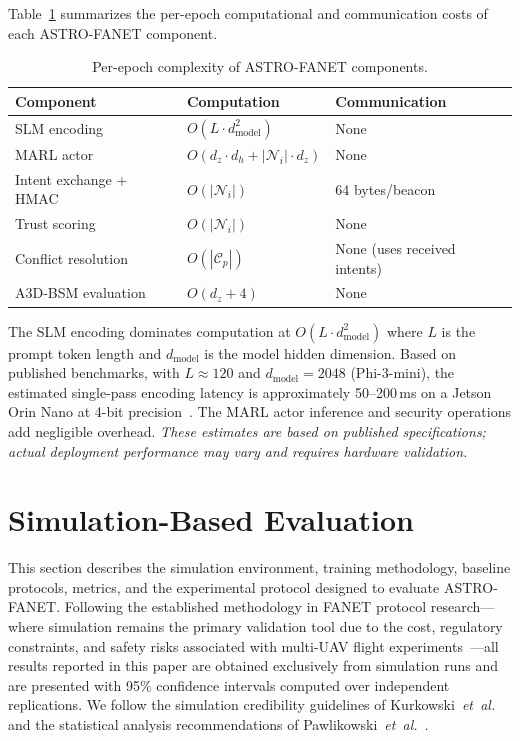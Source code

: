 \documentclass[5p,times]{elsarticle}
\begin{document}
Table~\ref{tab:complexity} summarizes the per-epoch computational and communication costs of each ASTRO-FANET component.

\begin{table}[t]
\centering
\caption{Per-epoch complexity of ASTRO-FANET components.}
\label{tab:complexity}
\scriptsize
\begin{tabular}{lll}
\toprule
Component & Computation & Communication \\
\midrule
SLM encoding & $O(L \cdot d_{\mathrm{model}}^2)$ & None \\
MARL actor & $O(d_z \cdot d_h + |\mathcal{N}_i| \cdot d_z)$ & None \\
Intent exchange + HMAC & $O(|\mathcal{N}_i|)$ & 64 bytes/beacon \\
Trust scoring & $O(|\mathcal{N}_i|)$ & None \\
Conflict resolution & $O(|\mathcal{C}_p|)$ & None (uses received intents) \\
A3D-BSM evaluation & $O(d_z + 4)$ & None \\
\bottomrule
\end{tabular}
\end{table}

The SLM encoding dominates computation at $O(L \cdot d_{\mathrm{model}}^2)$ where $L$ is the prompt token length and $d_{\mathrm{model}}$ is the model hidden dimension. Based on published benchmarks, with $L \approx 120$ and $d_{\mathrm{model}} = 2048$ (Phi-3-mini), the estimated single-pass encoding latency is approximately 50--200\,ms on a Jetson Orin Nano at 4-bit precision~\cite{abdin2024phi3,xu2024survey_slm}. The MARL actor inference and security operations add negligible overhead. \emph{These estimates are based on published specifications; actual deployment performance may vary and requires hardware validation.}

\section{Simulation-Based Evaluation}
\label{sec:experiments}

This section describes the simulation environment, training methodology, baseline protocols, metrics, and the experimental protocol designed to evaluate ASTRO-FANET. Following the established methodology in FANET protocol research---where simulation remains the primary validation tool due to the cost, regulatory constraints, and safety risks associated with multi-UAV flight experiments~\cite{bekmezci2013fanets,gupta2015survey_uav_simulation,khan2020routing}---all results reported in this paper are obtained exclusively from simulation runs and are presented with 95\% confidence intervals computed over independent replications. We follow the simulation credibility guidelines of Kurkowski~\textit{et~al.}~\cite{kurkowski2005manet_simulation} and the statistical analysis recommendations of Pawlikowski~\textit{et~al.}~\cite{pawlikowski2002credibility}.
\end{document}
